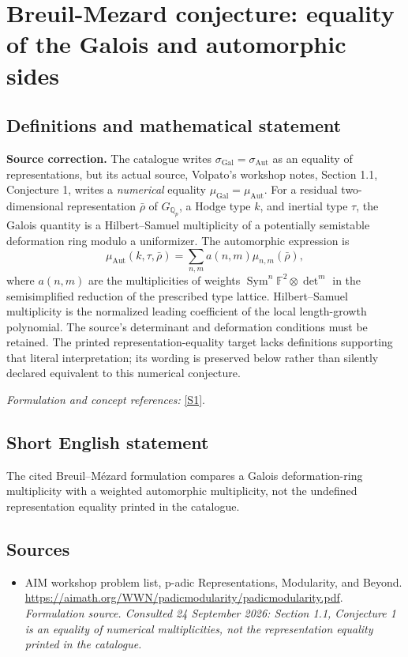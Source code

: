 \documentclass[11pt]{article}
\begin{document}
\section*{\texorpdfstring{Breuil-Mezard conjecture: equality of the Galois and automorphic sides}{Breuil-Mezard conjecture: equality of the Galois and automorphic sides}}\label{30006981}
\subsection{Definitions and mathematical statement}
\textbf{Source correction.} The catalogue writes $\sigma_{\mathrm{Gal}}=\sigma_{\mathrm{Aut}}$ as an equality of representations, but its actual source, Volpato's workshop notes, Section 1.1, Conjecture 1, writes a \emph{numerical} equality $\mu_{\mathrm{Gal}}=\mu_{\mathrm{Aut}}$. For a residual two-dimensional representation $\bar\rho$ of $G_{{\mathbb{Q}}_p}$, a Hodge type $k$, and inertial type $\tau$, the Galois quantity is a Hilbert--Samuel multiplicity of a potentially semistable deformation ring modulo a uniformizer. The automorphic expression is
\[
 \mu_{\mathrm{Aut}}(k,\tau,\bar\rho)=\sum_{n,m}a(n,m)\mu_{n,m}(\bar\rho),
\]
where $a(n,m)$ are the multiplicities of weights
$\operatorname{Sym}^n{\mathbb{F}}^2\otimes\det^m$ in the semisimplified reduction of the prescribed type lattice. Hilbert--Samuel multiplicity is the normalized leading coefficient of the local length-growth polynomial. The source's determinant and deformation conditions must be retained. The printed representation-equality target lacks definitions supporting that literal interpretation; its wording is preserved below rather than silently declared equivalent to this numerical conjecture.
\par\smallskip\textit{Formulation and concept references:} \href{https://aimath.org/WWN/padicmodularity/padicmodularity.pdf}{[S1]}.

\subsection{Short English statement}
The cited Breuil–Mézard formulation compares a Galois deformation-ring multiplicity with a weighted automorphic multiplicity, not the undefined representation equality printed in the catalogue.
\subsection{Sources}
\begin{itemize}
\item[S1]AIM workshop problem list, p-adic Representations, Modularity, and Beyond.
\url{https://aimath.org/WWN/padicmodularity/padicmodularity.pdf}.
\textit{Formulation source. Consulted 24 September 2026: Section 1.1, Conjecture 1 is an equality of numerical multiplicities, not the representation equality printed in the catalogue.}
\end{itemize}
\end{document}
